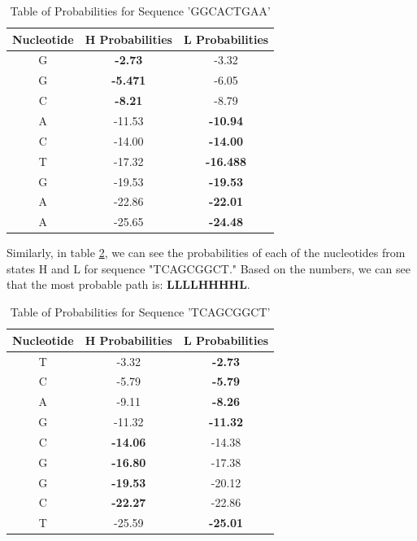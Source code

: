 \documentclass{article}
\begin{document}
\begin{table}[]
\begin{center}
\begin{tabular}{|c|c|c|}
\hline
Nucleotide & H Probabilities & L  Probabilities   \\ \hline
G & \textbf{-2.73} & -3.32 \\ \hline
G & \textbf{-5.471} & -6.05 \\ \hline
C & \textbf{-8.21} & -8.79 \\ \hline
A & -11.53  & \textbf{-10.94} \\ \hline
C & -14.00 & \textbf{-14.00} \\ \hline
T & -17.32 & \textbf{-16.488} \\ \hline
G & -19.53 & \textbf{-19.53} \\ \hline
A & -22.86 & \textbf{-22.01}\\ \hline
A & -25.65 & \textbf{-24.48} \\ \hline
\end{tabular}
\end{center}
\caption{Table of Probabilities for Sequence 'GGCACTGAA'}
\label{Tab:1}
\end{table}

Similarly, in table \ref{Tab:2}, we can see the probabilities of each of the nucleotides from states H and L for sequence "TCAGCGGCT." Based on the numbers, we can see that the most probable path is: \textbf {LLLLHHHHL}.\\

\begin{table}[]
\begin{center}
\begin{tabular}{|c|c|c|}
\hline
Nucleotide & H Probabilities   & L Probabilities   \\ \hline
T          & -3.32 & \textbf{-2.73} \\ \hline
C          & -5.79 & \textbf{-5.79} \\ \hline
A          & -9.11 & \textbf{-8.26} \\ \hline
G          & -11.32 & \textbf{-11.32} \\ \hline
C          & \textbf{-14.06}  & -14.38 \\ \hline
G          & \textbf{-16.80} & -17.38 \\ \hline
G          & \textbf{-19.53} & -20.12 \\ \hline
C          & \textbf{-22.27} & -22.86 \\ \hline
T          & -25.59 & \textbf{-25.01} \\ \hline
\end{tabular}
\end{center}
\caption{Table of Probabilities for Sequence 'TCAGCGGCT'}
\label{Tab:2}
\end{table}
\end{document}
